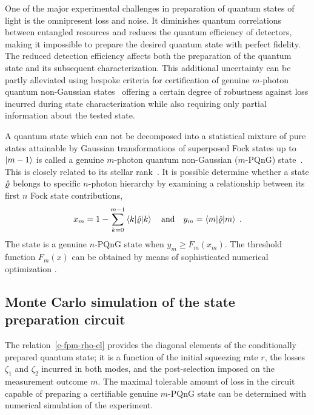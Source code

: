 \documentclass{article}
\begin{document}
One of the major experimental challenges in preparation of quantum states of light is the omnipresent loss and noise. It diminishes quantum correlations between entangled resources and reduces the quantum efficiency of detectors, making it impossible to prepare the desired quantum state with perfect fidelity. The reduced detection efficiency affects both the preparation of the quantum state and its subsequent characterization. This additional uncertainty can be partly alleviated using bespoke criteria for certification of genuine $m$-photon quantum non-Gaussian states~\cite{lachman2019} offering a certain degree of robustness against loss incurred during state characterization while also requiring only partial information about the tested state.

A quantum state which can not be decomposed into a statistical mixture of pure states attainable by Gaussian transformations of superposed Fock states up to ${\ket{m - 1}}$ is called a genuine $m$-photon quantum non-Gaussian ($m$-PQnG) state~\cite{lachman2019}. This is closely related to its stellar rank~\cite{chabaud2020,fiurasek2022}. It is possible determine whether a state $\hat{\varrho}$ belongs to specific $n$-photon hierarchy by examining a relationship between its first $n$ Fock state contributions,
\begin{equation}
  x_{m} 
    = 1 - \sum_{k = 0}^{m - 1} 
      \braket{k | \hat{\varrho} | k}
  \quad\text{and}\quad
  y_{m} = \braket{m | \hat{\varrho} | m}
  \;\text{.}
\end{equation}
%
The state is a genuine $n$-PQnG state when ${y_{m} \geq F_{m} (x_{m})}$. The threshold function $F_{m}(x)$ can be obtained by means of sophisticated numerical optimization \cite{lachman2019,fiurasek2022}.

%
%

\subsection*{Monte Carlo simulation of the state preparation circuit}

The relation~\eqref{e-fpm-rho-el} provides the diagonal elements of the conditionally prepared quantum state; it is a function of the initial squeezing rate $r$, the losses $\zeta_{1}$ and $\zeta_{2}$ incurred in both modes, and the post-selection imposed on the measurement outcome $m$. The maximal tolerable amount of loss in the circuit capable of preparing a certifiable genuine $m$-PQnG state can be determined with numerical simulation of the experiment. 
\end{document}
